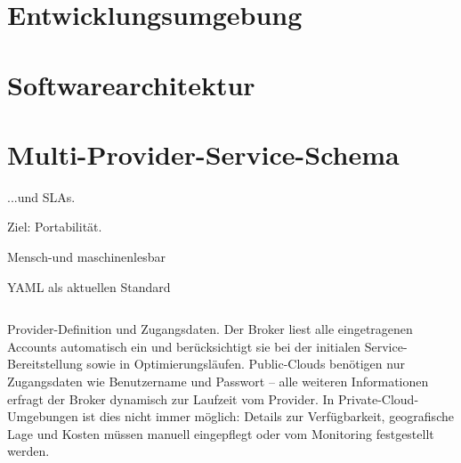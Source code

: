 






\section{Entwicklungsumgebung}


\section{Softwarearchitektur}

%


\section{Multi-Provider-Service-Schema}




...und SLAs.

Ziel: Portabilität.

Mensch-und maschinenlesbar

YAML als aktuellen Standard

%
%
\begin{listing}[ht]	
	\inputminted[]{yaml}{./src/provider.sample.yaml}
	\caption{Provider-Definition und Zugangsdaten. Der Broker liest alle eingetragenen Accounts automatisch ein und berücksichtigt sie bei der initialen Service-Bereitstellung sowie in Optimierungsläufen. Public-Clouds benötigen nur Zugangsdaten wie Benutzername und Passwort -- alle weiteren Informationen erfragt der Broker dynamisch zur Laufzeit vom Provider. In Private-Cloud-Umgebungen ist dies nicht immer möglich: Details zur Verfügbarkeit, geografische Lage und Kosten müssen manuell eingepflegt oder vom Monitoring festgestellt werden.}
	\label{listing:provider}
\end{listing}



